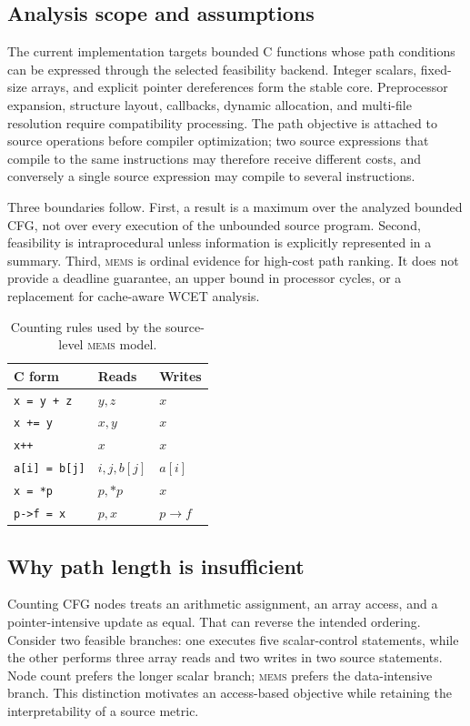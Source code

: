 \documentclass[10pt,conference]{IEEEtran}
\newcommand{\mems}{\textsc{mems}\xspace}
\newcommand{\code}[1]{\texttt{#1}}
\begin{document}
\subsection{Analysis scope and assumptions}
The current implementation targets bounded C functions whose path conditions can be expressed through the selected feasibility backend. Integer scalars, fixed-size arrays, and explicit pointer dereferences form the stable core. Preprocessor expansion, structure layout, callbacks, dynamic allocation, and multi-file resolution require compatibility processing. The path objective is attached to source operations before compiler optimization; two source expressions that compile to the same instructions may therefore receive different costs, and conversely a single source expression may compile to several instructions.

Three boundaries follow. First, a result is a maximum over the analyzed bounded CFG, not over every execution of the unbounded source program. Second, feasibility is intraprocedural unless information is explicitly represented in a summary. Third, \mems is ordinal evidence for high-cost path ranking. It does not provide a deadline guarantee, an upper bound in processor cycles, or a replacement for cache-aware WCET analysis.

\begin{table}[t]
\centering
\caption{Counting rules used by the source-level \mems model.}
\label{tab:counting}
\begin{tabular}{lll}
\toprule
C form & Reads & Writes\\
\midrule
\code{x = y + z} & $y,z$ & $x$\\
\code{x += y} & $x,y$ & $x$\\
\code{x++} & $x$ & $x$\\
\code{a[i] = b[j]} & $i,j,b[j]$ & $a[i]$\\
\code{x = *p} & $p,*p$ & $x$\\
\code{p->f = x} & $p,x$ & $p\!\rightarrow\!f$\\
\bottomrule
\end{tabular}
\end{table}

\subsection{Why path length is insufficient}
Counting CFG nodes treats an arithmetic assignment, an array access, and a pointer-intensive update as equal. That can reverse the intended ordering. Consider two feasible branches: one executes five scalar-control statements, while the other performs three array reads and two writes in two source statements. Node count prefers the longer scalar branch; \mems prefers the data-intensive branch. This distinction motivates an access-based objective while retaining the interpretability of a source metric.
\end{document}
